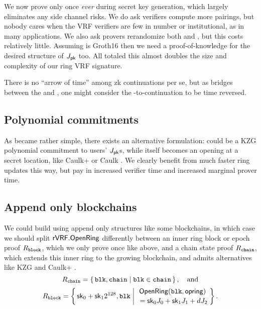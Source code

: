 We now prove \pisk only once {\it ever} during secret key generation,
which largely eliminates any side channel risks.
We do ask verifiers compute more pairings, but nobody cares when
the VRF verifiers are few in number or institutional,
as in many applications.
We also ask provers rerandomize both \pisk and \pipk, but this costs relatively little.
Assuming \pipk is Groth16 then we need a proof-of-knowledge for the desired structure of $J_\mathsf{pk}$ too.
All totaled this almost doubles the size and complexity of our ring VRF signature.

There is no ``arrow of time'' among zk continuations per se, but
as \pisk bridges between the \PedVRF and \pipk,
one might consider the \pisk-to-\pipk continuation to be time reversed.


\subsection{Polynomial commitments}

As \pipk became rather simple, %
there exists an alternative formulation:  
\comring could be a KZG polynomial commitment \cite{KZG} to users' $J_\mathsf{pk}$s,
while \pipk itself becomes an opening at a secret location, like
Caulk+ \cite{caulk+} or Caulk \cite{caulk}.
We clearly benefit from much faster ring updates this way, but pay in
 increased verifier time and increased marginal prover time.


\subsection{Append only blockchains}

\def\comblock{\ensuremath{\mathsf{comblock}}\xspace}
\newcommand\pichain{\ensuremath{\pi_{\mathtt{chain}}}\xspace}

We could build \ring using append only structures like some blockchains,
in which case we should split ${\mathsf{rVRF}}.{\mathsf{OpenRing}}$ differently between
an inner ring block or epoch proof $R_{\mathtt{block}}$,
 which we only prove once like \pisk above, and
a chain state proof $R_{\mathtt{chain}}$,
 which extends this inner ring to the growing blockchain, and
 admits alternatives like KZG and Caulk+ \cite{caulk+}.
%
$$ \baseL_{\mathtt{chain}} = \Setst{ \mathtt{blk}, \mathtt{chain} }{
	\mathtt{blk} \in \mathtt{chain}
} \mathcomma \quad\textrm{and} $$ 
%
$$ \baseL_{\mathtt{block}} = \Setst{ \sk_0 + \sk_1 2^{128}, \mathtt{blk} }{
	\eprint{\exists d,\openring \textrm{\ s.t.\ }}{}
	\genfrac{}{}{0pt}{}{ \OpenRing(\mathtt{blk},\openring) }{ \,\, = \sk_0 \genJ_0 + \sk_1 \genJ_1 + d \genJ_2 }
} \mathperiod $$  

